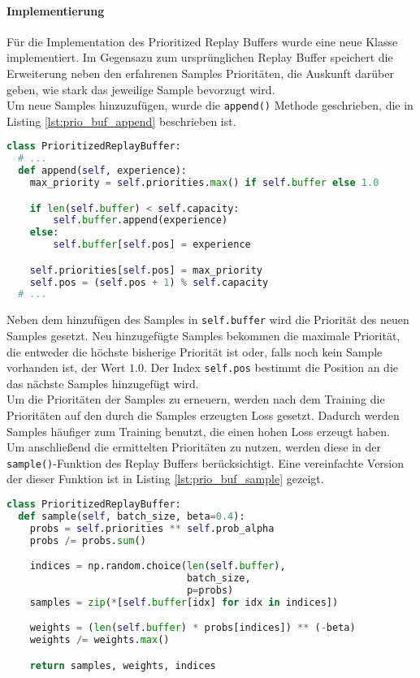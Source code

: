 \documentclass[11pt]{scrartcl}
\begin{document}
\paragraph*{Implementierung}
\noindent
\newline
Für die Implementation des Prioritized Replay Buffers wurde eine neue Klasse
implementiert. Im Gegensazu zum ursprünglichen Replay Buffer speichert die Erweiterung
neben den erfahrenen Samples Prioritäten, die Auskunft darüber geben, wie stark das
jeweilige Sample bevorzugt wird.\\
Um neue Samples hinzuzufügen, wurde die \lstinline!append()! Methode geschrieben, die in
Listing \ref{lst:prio_buf_append} beschrieben ist.
\begin{lstlisting}[language=Python, caption=append()-Funktion des PrioritizedReplayBuffers,
label=lst:prio_buf_append]
class PrioritizedReplayBuffer:
  # ...
  def append(self, experience):
    max_priority = self.priorities.max() if self.buffer else 1.0

    if len(self.buffer) < self.capacity:
        self.buffer.append(experience)
    else:
        self.buffer[self.pos] = experience

    self.priorities[self.pos] = max_priority
    self.pos = (self.pos + 1) % self.capacity
  # ...
\end{lstlisting}
\noindent
Neben dem hinzufügen des Samples in \lstinline!self.buffer! wird die Priorität des neuen
Samples gesetzt. Neu hinzugefügte Samples bekommen die maximale Priorität, die entweder
die höchste bisherige Priorität ist oder, falls noch kein Sample vorhanden ist, der Wert
$1.0$. Der Index \lstinline!self.pos! bestimmt die Position an die das nächste Samples
hinzugefügt wird.\\
Um die Prioritäten der Samples zu erneuern, werden nach dem Training die Prioritäten auf
den durch die Samples erzeugten Loss gesetzt. Dadurch werden Samples häufiger zum
Training benutzt, die einen hohen Loss erzeugt haben.\\
Um anschließend die ermittelten Prioritäten zu nutzen, werden diese in der
\lstinline!sample()!-Funktion des Replay Buffers berücksichtigt. Eine vereinfachte Version
der dieser Funktion ist in Listing \ref{lst:prio_buf_sample} gezeigt.
\begin{lstlisting}[language=Python, caption=sample()-Funktion des PrioritizedReplayBuffers,
label=lst:prio_buf_sample]
class PrioritizedReplayBuffer:
  def sample(self, batch_size, beta=0.4):
    probs = self.priorities ** self.prob_alpha
    probs /= probs.sum()

    indices = np.random.choice(len(self.buffer),
                               batch_size,
                               p=probs)
    samples = zip(*[self.buffer[idx] for idx in indices])

    weights = (len(self.buffer) * probs[indices]) ** (-beta)
    weights /= weights.max()

    return samples, weights, indices
\end{lstlisting}
\end{document}
